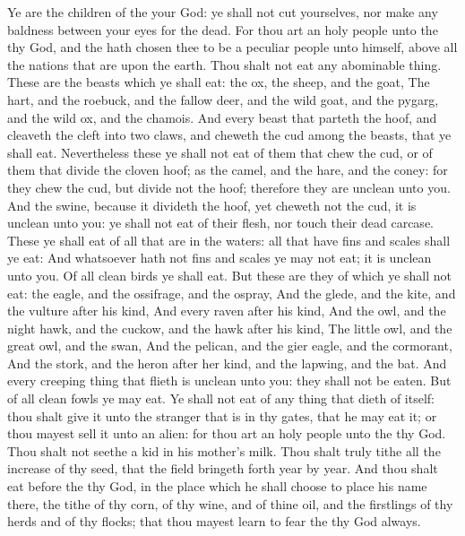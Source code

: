 \begin{biblechapter} %
 Ye are the children of the \LORD your God: ye shall not cut yourselves, nor make any baldness between your eyes for the dead.
\verse For thou art an holy people unto the \LORD thy God, and the \LORD hath chosen thee to be a peculiar people unto himself, above all the nations that are upon the earth.
\verse Thou shalt not eat any abominable thing.
\verse These are the beasts which ye shall eat: the ox, the sheep, and the goat,
\verse The hart, and the roebuck, and the fallow deer, and the wild goat, and the pygarg, and the wild ox, and the chamois.
\verse And every beast that parteth the hoof, and cleaveth the cleft into two claws, and cheweth the cud among the beasts, that ye shall eat.
\verse Nevertheless these ye shall not eat of them that chew the cud, or of them that divide the cloven hoof; as the camel, and the hare, and the coney: for they chew the cud, but divide not the hoof; therefore they are unclean unto you.
\verse And the swine, because it divideth the hoof, yet cheweth not the cud, it is unclean unto you: ye shall not eat of their flesh, nor touch their dead carcase.
\verse These ye shall eat of all that are in the waters: all that have fins and scales shall ye eat:
\verse And whatsoever hath not fins and scales ye may not eat; it is unclean unto you.
\verse Of all clean birds ye shall eat.
\verse But these are they of which ye shall not eat: the eagle, and the ossifrage, and the ospray,
\verse And the glede, and the kite, and the vulture after his kind,
\verse And every raven after his kind,
\verse And the owl, and the night hawk, and the cuckow, and the hawk after his kind,
\verse The little owl, and the great owl, and the swan,
\verse And the pelican, and the gier eagle, and the cormorant,
\verse And the stork, and the heron after her kind, and the lapwing, and the bat.
\verse And every creeping thing that flieth is unclean unto you: they shall not be eaten.
\verse But of all clean fowls ye may eat.
\verse Ye shall not eat of any thing that dieth of itself: thou shalt give it unto the stranger that is in thy gates, that he may eat it; or thou mayest sell it unto an alien: for thou art an holy people unto the \LORD thy God. Thou shalt not seethe a kid in his mother's milk.
 Thou shalt truly tithe all the increase of thy seed, that the field bringeth forth year by year.
\verse And thou shalt eat before the \LORD thy God, in the place which he shall choose to place his name there, the tithe of thy corn, of thy wine, and of thine oil, and the firstlings of thy herds and of thy flocks; that thou mayest learn to fear the \LORD thy God always.

\end{biblechapter}
